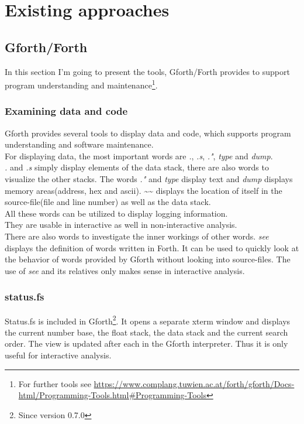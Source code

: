 \section{Existing approaches}

\subsection{Gforth/Forth}

In this section I'm going to present the tools, Gforth/Forth provides to support program understanding and maintenance\footnote{For further tools see \url{https://www.complang.tuwien.ac.at/forth/gforth/Docs-html/Programming-Tools.html\#Programming-Tools}}.

\subsubsection*{Examining data and code}
Gforth provides several tools to display data and code, which supports program understanding and software maintenance.\\
For displaying data, the most important words are \emph{.}, \emph{.s}, \emph{."}, \emph{type} and \emph{dump}.\\
\emph{.} and \emph{.s} simply display elements of the data stack, there are also words to visualize the other stacks.
The words \emph{."} and \emph{type} display text and \emph{dump} displays memory areas(address, hex and ascii).
\textasciitilde\textasciitilde\:  displays the location of itself in the source-file(file and line number) as well as the data stack.\\
All these words can be utilized to display logging information.\\
They are usable in interactive as well in non-interactive analysis.\\
There are also words to investigate the inner workings of other words. 
\emph{see} displays the definition of words written in Forth. It can be used to quickly look at the behavior of words provided by Gforth without looking into source-files. The use of \emph{see} and its relatives only makes sense in interactive analysis.

\subsubsection*{status.fs}
Status.fs is included in Gforth\footnote{Since version 0.7.0}. It opens a separate xterm window and displays the current number base, the float stack, the data stack and the current search order. The view is updated after each \keys{\return} in the Gforth interpreter. Thus it is only useful for interactive analysis.

